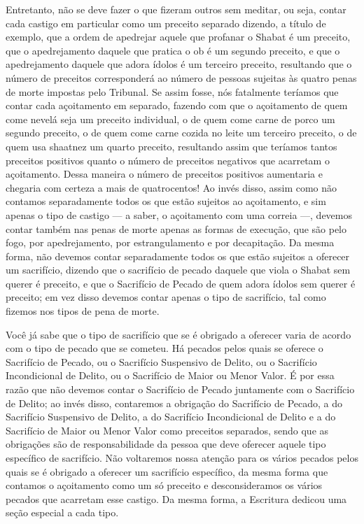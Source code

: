 Entretanto, não se deve fazer o que fizeram outros sem meditar, ou seja,
contar cada castigo em particular como um preceito separado dizendo, a
título de exemplo, que a ordem de apedrejar aquele que profanar o Shabat
é um preceito, que o apedrejamento daquele que pratica o ob\starr{} é um
segundo preceito, e que o apedrejamento daquele que adora ídolos é um
terceiro preceito, resultando que o número de preceitos corresponderá ao
número de pessoas sujeitas às quatro penas de morte impostas pelo
Tribunal. Se assim fosse, nós fatalmente teríamos que contar cada
açoitamento em separado, fazendo com que o açoitamento de quem come
nevelá\starr{} seja um preceito individual, o de quem come carne de porco um
segundo preceito, o de quem come carne cozida no leite um terceiro
preceito, o de quem usa shaatnez\starr{} um quarto preceito, resultando
assim que teríamos tantos preceitos positivos quanto o número de
preceitos negativos que acarretam o açoitamento. Dessa maneira o número
de preceitos positivos aumentaria e chegaria com certeza a mais de
quatrocentos! Ao invés disso, assim como não contamos separadamente
todos os que estão sujeitos ao açoitamento, e sim apenas o tipo de
castigo --- a saber, o açoitamento com uma correia ---, devemos contar
também nas penas de morte apenas as formas de execução, que são pelo
fogo, por apedrejamento, por estrangulamento e por decapitação. Da
mesma forma, não devemos contar separadamente todos os que estão
sujeitos a oferecer um sacrifício, dizendo que o sacrifício de pecado
daquele que viola o Shabat sem querer é preceito, e que o Sacrifício de
Pecado de quem adora ídolos sem querer é preceito; em vez disso devemos
contar apenas o tipo de sacrifício, tal como fizemos nos tipos de pena
de morte.

Você já sabe que o tipo de sacrifício que se é obrigado a oferecer varia
de acordo com o tipo de pecado que se cometeu. Há pecados pelos quais se
oferece o Sacrifício de Pecado, ou o Sacrifício Suspensivo de Delito, ou
o Sacrifício Incondicional de Delito, ou o Sacrifício de Maior ou Menor
Valor.
É por essa razão que não devemos contar o Sacrifício de Pecado
juntamente com o Sacrifício de Delito; ao invés disso, contaremos a
obrigação do Sacrifício de Pecado, a do Sacrifício Suspensivo de
Delito, a do Sacrifício Incondicional de Delito e a do Sacrifício de
Maior ou Menor Valor como preceitos separados, sendo que as obrigações
são de responsabilidade da pessoa que deve oferecer aquele tipo
específico de sacrifício. Não voltaremos nossa atenção para os vários
pecados pelos quais se é obrigado a oferecer um sacrifício específico,
da mesma forma que contamos o açoitamento como um só preceito e
desconsideramos os vários pecados que acarretam esse castigo. Da mesma
forma, a Escritura dedicou uma seção especial a cada tipo.

